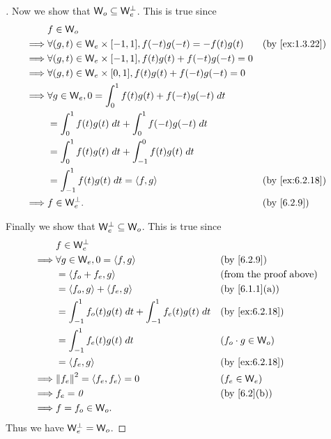 \begin{proof}[]
	Now we show that \(\mathsf{W}_o \subseteq \mathsf{W}_e^{\perp}\).
	This is true since
	\begin{align*}
		         & f \in \W_o                                                                              \\
		\implies & \forall (g, t) \in \W_e \times [-1, 1], f(-t) g(-t) = -f(t) g(t)    &  & \by{ex:1.3.22} \\
		\implies & \forall (g, t) \in \W_e \times [-1, 1], f(t) g(t) + f(-t) g(-t) = 0                     \\
		\implies & \forall (g, t) \in \W_e \times [0, 1], f(t) g(t) + f(-t) g(-t) = 0                      \\
		\implies & \forall g \in \W_e, 0 = \int_0^1 f(t) g(t) + f(-t) g(-t) \; dt                          \\
		         & = \int_0^1 f(t) g(t) \; dt + \int_0^1 f(-t) g(-t) \; dt                                 \\
		         & = \int_0^1 f(t) g(t) \; dt + \int_{-1}^0 f(t) g(t) \; dt                                \\
		         & = \int_{-1}^1 f(t) g(t) \; dt = \inn{f, g}                          &  & \by{ex:6.2.18} \\
		\implies & f \in \W_e^{\perp}.                                                 &  & \by{6.2.9}
	\end{align*}

	Finally we show that \(\mathsf{W}_e^{\perp} \subseteq \mathsf{W}_o\).
	This is true since
	\begin{align*}
		         & f \in \W_e^{\perp}                                                                                 \\
		\implies & \forall g \in \W_e, 0 = \inn{f, g}                              &  & \by{6.2.9}                    \\
		         & = \inn{f_o + f_e, g}                                            &  & \text{(from the proof above)} \\
		         & = \inn{f_o, g} + \inn{f_e, g}                                   &  & \by{6.1.1}[a]                 \\
		         & = \int_{-1}^1 f_o(t) g(t) \; dt + \int_{-1}^1 f_e(t) g(t) \; dt &  & \by{ex:6.2.18}                \\
		         & = \int_{-1}^1 f_e(t) g(t) \; dt                                 &  & (f_o \cdot g \in \W_o)        \\
		         & = \inn{f_e, g}                                                  &  & \by{ex:6.2.18}                \\
		\implies & \norm{f_e}^2 = \inn{f_e, f_e} = 0                               &  & (f_e \in \W_e)                \\
		\implies & f_e = \zv                                                       &  & \by{6.2}[b]                   \\
		\implies & f = f_o \in \W_o.
	\end{align*}
	Thus we have \(\mathsf{W}_e^{\perp} = \mathsf{W}_o\).
\end{proof}

